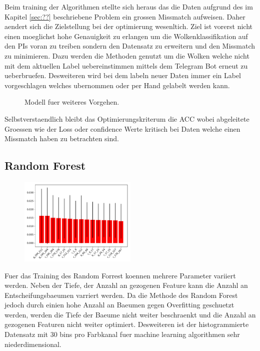 Beim training der Algorithmen stellte sich heraus das die Daten aufgrund des im
Kapitel \ref{sec:??} beschriebene Problem ein grossen Missmatch aufweisen. 
Daher aendert sich die Zielstellung bei der optimierung wesenltich.
Ziel ist vorerst nicht einen moeglichst hohe Genauigkeit zu erlangen um die
Wolkenklassifikation auf den PIs voran zu treiben sondern den Datensatz zu
erweitern und den Missmatch zu minimieren.
Dazu werden die Methoden genutzt um die Wolken welche nicht mit dem aktuellen
Label uebereinstimmen mittels dem Telegram Bot erneut zu ueberbruefen.
Desweiteren wird bei dem labeln neuer Daten immer ein Label vorgeschlagen
welches ubernommen oder per Hand gelabelt werden kann.
\begin{figure}
		\centering
{}
		\caption{Modell fuer weiteres Vorgehen.}
		\label{fig:}
\end{figure}

Selbstverstaendlich bleibt das Optimierungskriterum die ACC wobei abgeleitete
Groessen wie der Loss oder confidence Werte kritisch bei Daten welche einen
Missmatch haben zu betrachten sind.

\subsection{Random Forest}%
\label{sub:random_forest}
\begin{figure}
		\centering
		\includegraphics[width=0.5\textwidth]{./pictures/train_rf.pdf}
		\caption{}
		\label{fig:}
\end{figure}
Fuer das Training des Random Forrest koennen mehrere Parameter variiert werden.
Neben der Tiefe, der Anzahl an gezogenen Feature kann die Anzahl an
Entscheifungsbaeumen varriert werden.
Da die Methode des Random Forest jedoch durch einien hohe Anzahl an Baeumen
gegen Overfitting geschuetzt werden, werden die Tiefe der Baeume nicht weiter
beschraenkt und die Anzahl an gezogenen Featuren nicht weiter optimiert.
Desweiteren ist der histogrammierte Datensatz mit 30 bins pro Farbkanal fuer
machine learning algorithmen sehr niederdimensional.

